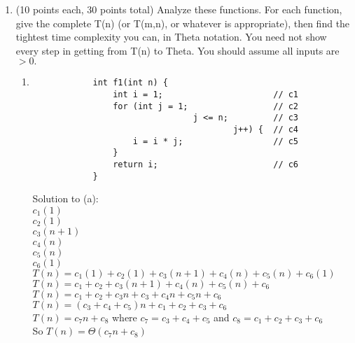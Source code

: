 \documentclass[12pt]{article}
\begin{document}
\begin{enumerate}
\item (10 points each, 30 points total) Analyze these functions. For each function, 
give the complete T(n) (or T(m,n), or whatever is appropriate), then find the tightest 
time complexity you can, in Theta notation. You need not show every step in getting 
from T(n) to Theta. You should assume all inputs are $> 0.$ 
	\begin{enumerate}
	\item	\begin{verbatim}
			int f1(int n) {
			    int i = 1;                      // c1
			    for (int j = 1;                 // c2
			                    j <= n;         // c3
			                            j++) {  // c4
			        i = i * j;                  // c5
			    }
			    return i;                       // c6
			}
		\end{verbatim}
	Solution to (a):
	\\$c_1(1)$
	\\$c_2(1)$
	\\$c_3(n+1)$
	\\$c_4(n)$
	\\$c_5(n)$
	\\$c_6(1)$
	\\$T(n) = c_1(1) + c_2(1)+c_3(n+1)+c_4(n)+c_5(n)+c_6(1)$
	\\$T(n) = c_1+ c_2+c_3(n+1)+c_4(n)+c_5(n)+c_6$
	\\$T(n) = c_1 + c_2 + c_3n + c_3 + c_4n + c_5n + c_6$
	\\$T(n) = (c_3+c_4+c_5)n + c_1 + c_2 + c_3 + c_6$
	\\$T(n) = c_7n + c_8$ where $c_7 = c_3+c_4+c_5$ and $c_8 = c_1 + c_2+c_3+c_6$
	\\So $T(n) = \Theta(c_7n + c_8)$
	\\\\


\end{enumerate}
\end{enumerate}
\end{document}
